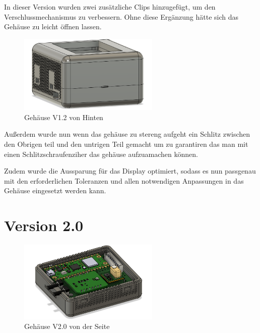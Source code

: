 \begin{inhalt}
In dieser Version wurden zwei zusätzliche Clips hinzugefügt, um den Verschlussmechanismus zu verbessern.  
Ohne diese Ergänzung hätte sich das Gehäuse zu leicht öffnen lassen.

\vspace{1cm}

\begin{figure}[!htb]
\centering
\includegraphics[width=0.6\textwidth]{files/Thomas/pics/geheause/1.2/gehaeuse_back.png}
\caption[Bildbezeichnung für Abbildungsverzeichnis]{Gehäuse V1.2 von Hinten}
\label{fig:gehaeuse_internet_bild}
\end{figure}

Außerdem wurde nun wenn das gehäuse zu stereng aufgeht ein Schlitz zwischen den Obrigen teil und den untrigen Teil gemacht um zu garantiren das man mit einen Schlitzschraufenziher das gehäuse aufzuamachen können.

\vspace{0.15cm}

Zudem wurde die Aussparung für das Display optimiert, sodass es nun passgenau mit den erforderlichen Toleranzen und allen notwendigen Anpassungen in das Gehäuse eingesetzt werden kann.

\newpage

\section{Version 2.0}

\begin{figure}[!htb]
\centering
\includegraphics[width=0.6\textwidth]{files/Thomas/pics/geheause/2.0/gehaeuse_side.png}
\caption[Bildbezeichnung für Abbildungsverzeichnis]{Gehäuse V2.0 von der Seite}
\label{fig:gehaeuse_internet_bild}
\end{figure}


\end{inhalt}
